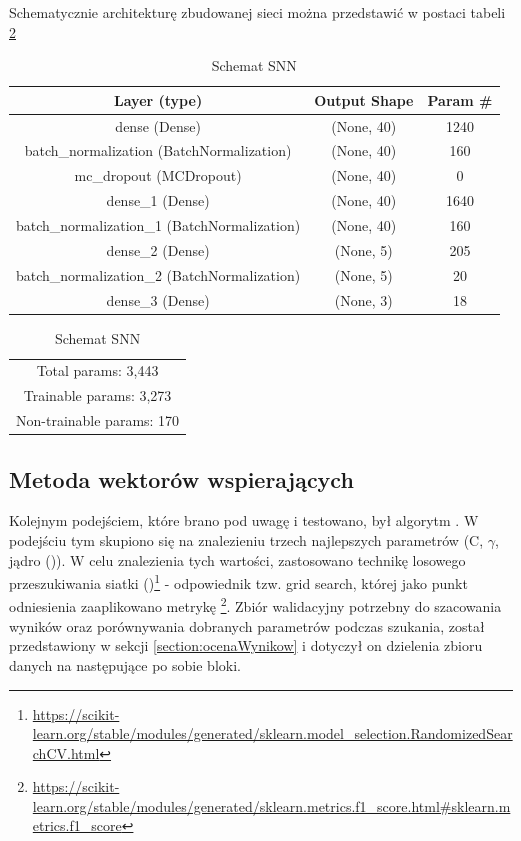         Schematycznie architekturę zbudowanej sieci można przedstawić w postaci tabeli \ref{tab:SNNTable}
        \begin{table}[H]
            \centering
            \caption{Schemat SNN}
            \label{tab:SNNTable}
            \begin{tabular}{|c|c|c|}
            \hline
                Layer (type) &  Output Shape & Param \#\\ \hline \hline
                dense (Dense) & (None, 40) & 1240 \\ \hline
                batch\_normalization (BatchNormalization) & (None, 40) & 160 \\ \hline 
                mc\_dropout (MCDropout) & (None, 40) & 0 \\ \hline         
                dense\_1 (Dense) & (None, 40) & 1640 \\ \hline      
                batch\_normalization\_1 (BatchNormalization) & (None, 40) & 160 \\ \hline
                dense\_2 (Dense) & (None, 5) &  205 \\ \hline       
                batch\_normalization\_2 (BatchNormalization)  & (None, 5) &  20 \\ \hline
                dense\_3 (Dense) & (None, 3) &  18 \\ \hline \hline 
            \end{tabular}
            	\begin{tabular} {| c |}
                Total params: 3,443 \\
                Trainable params: 3,273 \\
                Non-trainable params: 170 \\
                \hline
                \end{tabular}
        \end{table}
        \subsection{Metoda wektorów wspierających}
        \noindent Kolejnym podejściem, które brano pod uwagę i testowano, był algorytm . W podejściu tym skupiono się na znalezieniu trzech najlepszych parametrów (C, $\gamma$, jądro ()). W celu znalezienia tych wartości, zastosowano technikę losowego przeszukiwania siatki ()\footnote{\url{https://scikit-learn.org/stable/modules/generated/sklearn.model_selection.RandomizedSearchCV.html}} - odpowiednik tzw. grid search, której jako punkt odniesienia zaaplikowano metrykę \footnote{\url{https://scikit-learn.org/stable/modules/generated/sklearn.metrics.f1_score.html\#sklearn.metrics.f1_score}}. Zbiór walidacyjny potrzebny do szacowania wyników oraz porównywania dobranych parametrów podczas szukania, został przedstawiony w sekcji \ref{section:ocenaWynikow} i dotyczył on dzielenia zbioru danych na następujące po sobie bloki.
        
